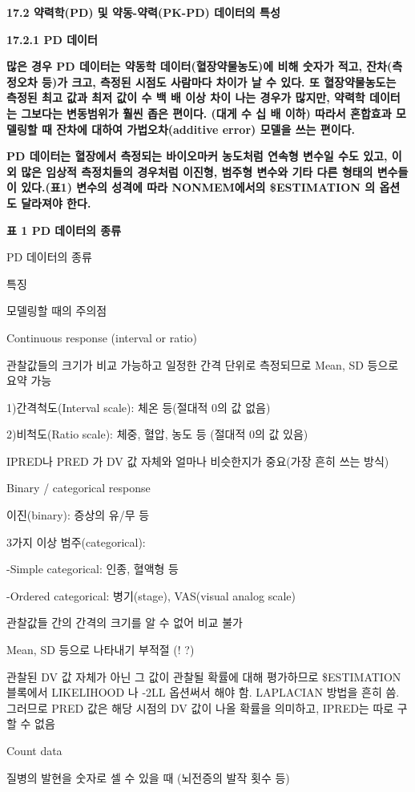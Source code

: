 \documentclass[
  10pt,
]{krantz}
\begin{document}
\textbf{17.2 약력학(PD) 및 약동-약력(PK-PD) 데이터의 특성}

\textbf{17.2.1 PD 데이터}

\textbf{많은 경우 PD 데이터는 약동학 데이터(혈장약물농도)에 비해 숫자가 적고, 잔차(측정오차 등)가 크고, 측정된 시점도 사람마다
차이가 날 수 있다. 또 혈장약물농도는 측정된 최고 값과 최저 값이 수 백 배 이상 차이 나는 경우가 많지만, 약력학 데이터는
그보다는 변동범위가 훨씬 좁은 편이다. (대게 수 십 배 이하) 따라서 혼합효과 모델링할 때 잔차에 대하여
가법오차(additive error) 모델을 쓰는 편이다.}

\textbf{PD 데이터는 혈장에서 측정되는 바이오마커 농도처럼 연속형 변수일 수도 있고, 이외 많은 임상적 측정치들의 경우처럼 이진형,
범주형 변수와 기타 다른 형태의 변수들이 있다.(표1) 변수의 성격에 따라 NONMEM에서의 \$ESTIMATION 의 옵션도
달라져야 한다.}

\textbf{표 1 PD 데이터의 종류}

PD 데이터의 종류

특징

모델링할 때의 주의점

Continuous response (interval or ratio)

관찰값들의 크기가 비교 가능하고 일정한 간격 단위로 측정되므로 Mean, SD 등으로 요약 가능

1)간격척도(Interval scale): 체온 등(절대적 0의 값 없음)

2)비척도(Ratio scale): 체중, 혈압, 농도 등 (절대적 0의 값 있음)

IPRED나 PRED 가 DV 값 자체와 얼마나 비슷한지가 중요(가장 흔히 쓰는 방식)

Binary / categorical response

이진(binary): 증상의 유/무 등

3가지 이상 범주(categorical):

-Simple categorical: 인종, 혈액형 등

-Ordered categorical: 병기(stage), VAS(visual analog scale)

관찰값들 간의 간격의 크기를 알 수 없어 비교 불가

Mean, SD 등으로 나타내기 부적절 (! ?)

관찰된 DV 값 자체가 아닌 그 값이 관찰될 확률에 대해 평가하므로 \$ESTIMATION 블록에서 LIKELIHOOD 나 -2LL 옵션써서 해야 함. LAPLACIAN 방법을 흔히 씀. 그러므로 PRED 값은 해당 시점의 DV 값이 나올 확률을 의미하고, IPRED는 따로 구할 수 없음

Count data

질병의 발현을 숫자로 셀 수 있을 때 (뇌전증의 발작 횟수 등)
\end{document}
